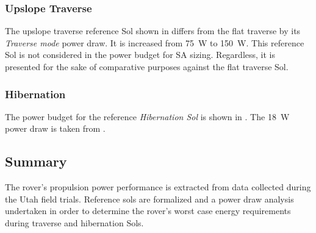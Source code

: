 


\subsubsection{Upslope Traverse}
\label{sec:Design:PowerBudget:TraversePowerBudget:UpslopeTraverse}
The upslope traverse reference Sol shown in  differs from the flat traverse by its \textit{Traverse mode} power draw. It is increased from \SI{75}{\watt} to \SI{150}{\watt}. This reference Sol is not considered in the power budget for \ac{SA} sizing. Regardless, it is presented for the sake of comparative purposes against the flat traverse Sol.




\subsubsection{Hibernation}
\label{sec:Design:PowerBudget:TraversePowerBudget:Hibernation}
The power budget for the reference \textit{Hibernation Sol} is shown in . The \SI{18}{\watt} power draw is taken from .



\subsection{Summary}
\label{sec:PowerBudget:Summary}
The rover's propulsion power performance is extracted from data collected during the Utah field trials. Reference sols are formalized and a power draw analysis undertaken in order to determine the rover's worst case energy requirements during traverse and hibernation Sols.
